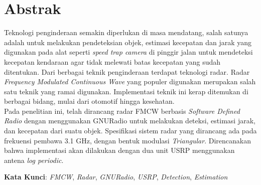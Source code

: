 
\chapter*{Abstrak}
\vspace*{0.7cm}

Teknologi penginderaan semakin diperlukan di masa mendatang, salah satunya adalah untuk melakukan pendeteksian objek, estimasi kecepatan dan jarak yang digunakan pada alat seperti \textit{speed trap camera} di pinggir jalan untuk mendeteksi kecepatan kendaraan agar tidak melewati batas kecepatan yang sudah ditentukan. Dari berbagai teknik penginderaan terdapat teknologi radar. Radar \textit{Frequency Modulated Continuous Wave} yang populer digunakan merupakan salah satu teknik yang ramai digunakan. Implementasi teknik ini kerap ditemukan di berbagai bidang, mulai dari otomotif hingga kesehatan.\\

Pada penelitian ini, telah dirancang radar FMCW berbasis \textit{Software Defined Radio} dengan menggunakan GNURadio untuk melakukan deteksi, estimasi jarak, dan kecepatan dari suatu objek. Spesifikasi sistem radar yang dirancang ada pada frekuensi pembawa 3.1 GHz, dengan bentuk modulasi \textit{Triangular}. Direncanakan bahwa implementasi akan dilakukan dengan dua unit USRP menggunakan antena \textit{log periodic}.



\vspace*{0.2cm}

\noindent \textbf{Kata Kunci}: \textit{FMCW}, \textit{Radar}, \textit{GNURadio}, \textit{USRP}, \textit{Detection}, \textit{Estimation}\\ 

\newpage
